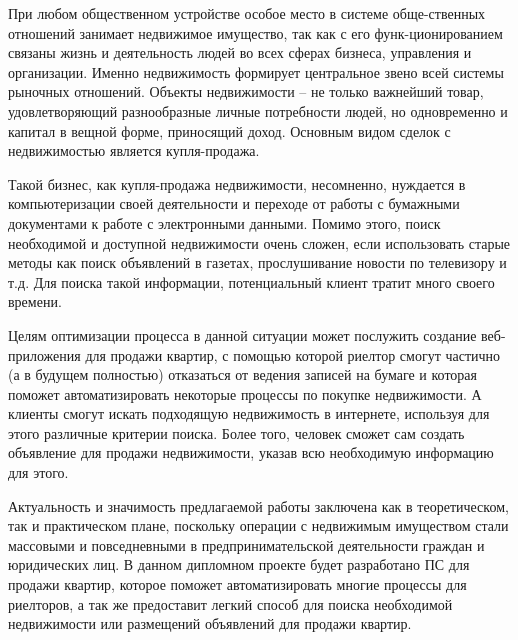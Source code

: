 \label{sec:intro}
При любом общественном устройстве особое место в системе обще-ственных отношений занимает недвижимое имущество, так как с его функ-ционированием связаны жизнь и деятельность людей во всех сферах бизнеса, управления и организации. Именно недвижимость формирует центральное звено всей системы рыночных отношений. Объекты недвижимости – не только важнейший товар, удовлетворяющий разнообразные личные потребности людей, но одновременно и капитал в вещной форме, приносящий доход. Основным видом сделок с недвижимостью является купля-продажа. 

Такой бизнес, как купля-продажа недвижимости, несомненно, нуждается в компьютеризации своей деятельности и переходе от работы с бумажными документами к работе с электронными данными. Помимо этого, поиск необходимой и доступной недвижимости очень сложен, если использовать старые методы как поиск объявлений в газетах, прослушивание новости по телевизору и т.д. Для поиска такой информации, потенциальный клиент тратит много своего времени. 

Целям оптимизации процесса в данной ситуации может послужить создание веб-приложения для продажи квартир, с помощью которой риелтор смогут частично (а в будущем полностью) отказаться от ведения записей на бумаге и которая поможет автоматизировать некоторые процессы по покупке недвижимости. А клиенты смогут искать подходящую недвижимость в интернете, используя для этого различные критерии поиска. Более того, человек сможет сам создать объявление для продажи недвижимости, указав всю необходимую информацию для этого.

Актуальность и значимость предлагаемой работы заключена как в теоретическом, так и практическом плане, поскольку операции с недвижимым имуществом стали массовыми и повседневными в предпринимательской деятельности граждан и юридических лиц. В данном дипломном проекте будет разработано ПС для продажи квартир, которое поможет автоматизировать многие процессы для риелторов, а так же предоставит легкий способ для поиска необходимой недвижимости или размещений объявлений для продажи квартир.
